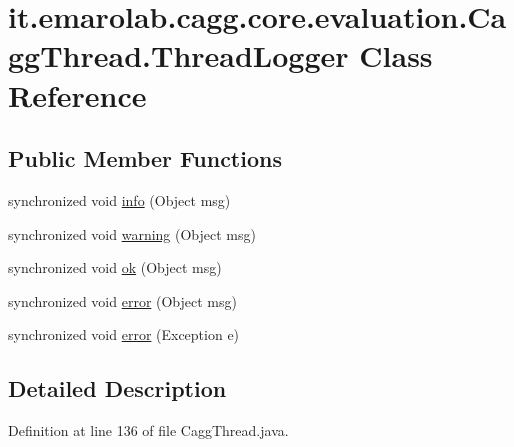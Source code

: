 \hypertarget{classit_1_1emarolab_1_1cagg_1_1core_1_1evaluation_1_1CaggThread_1_1ThreadLogger}{\section{it.\-emarolab.\-cagg.\-core.\-evaluation.\-Cagg\-Thread.\-Thread\-Logger Class Reference}
\label{classit_1_1emarolab_1_1cagg_1_1core_1_1evaluation_1_1CaggThread_1_1ThreadLogger}
}
\subsection*{Public Member Functions}
\begin{DoxyCompactItemize}
\item 
synchronized void \hyperlink{classit_1_1emarolab_1_1cagg_1_1core_1_1evaluation_1_1CaggThread_1_1ThreadLogger_ad806900f38a02ca6968bd18cf7a98ba8}{info} (Object msg)
\item 
synchronized void \hyperlink{classit_1_1emarolab_1_1cagg_1_1core_1_1evaluation_1_1CaggThread_1_1ThreadLogger_a915bdfef0e47aaa6e52befc646ad3a4c}{warning} (Object msg)
\item 
synchronized void \hyperlink{classit_1_1emarolab_1_1cagg_1_1core_1_1evaluation_1_1CaggThread_1_1ThreadLogger_a10f2a8634c698b5cf2e90a3267d50377}{ok} (Object msg)
\item 
synchronized void \hyperlink{classit_1_1emarolab_1_1cagg_1_1core_1_1evaluation_1_1CaggThread_1_1ThreadLogger_ae581ca616bdf4536d7494e6485222e01}{error} (Object msg)
\item 
synchronized void \hyperlink{classit_1_1emarolab_1_1cagg_1_1core_1_1evaluation_1_1CaggThread_1_1ThreadLogger_ae72be2ec85f0e2291249577798909301}{error} (Exception e)
\end{DoxyCompactItemize}


\subsection{Detailed Description}


Definition at line 136 of file Cagg\-Thread.\-java.



